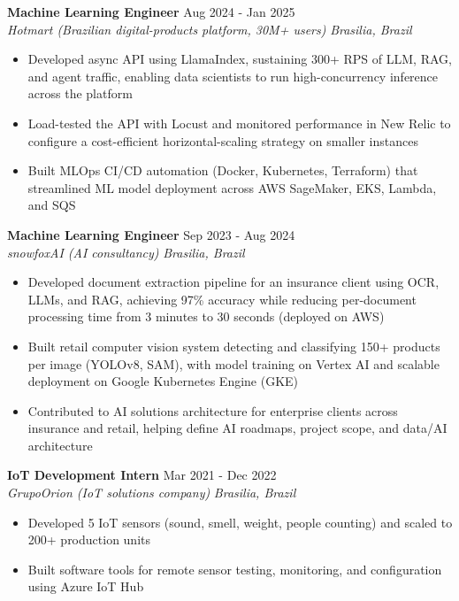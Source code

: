\documentclass[a4paper,10pt]{article}
\newcommand{\entry}[4]{
    \noindent \textbf{#1} \hfill #2 \\
    \textit{#3} \hfill \textit{#4}
}
\begin{document}
\entry{Machine Learning Engineer}{Aug 2024 - Jan 2025}
{Hotmart (Brazilian digital-products platform, 30M+ users)}{Brasilia, Brazil}
\begin{itemize}[noitemsep, topsep=0pt, leftmargin=1.5em]
    \item Developed async API using LlamaIndex, sustaining 300+ RPS of LLM, RAG, and agent traffic, enabling data scientists to run high-concurrency inference across the platform
    \item Load-tested the API with Locust and monitored performance in New Relic to configure a cost-efficient horizontal-scaling strategy on smaller instances
    \item Built MLOps CI/CD automation (Docker, Kubernetes, Terraform) that streamlined ML model deployment across AWS SageMaker, EKS, Lambda, and SQS
\end{itemize}

\vspace{0.15cm}

\entry{Machine Learning Engineer}{Sep 2023 - Aug 2024}
{snowfoxAI (AI consultancy)}{Brasilia, Brazil}
\begin{itemize}[noitemsep, topsep=0pt, leftmargin=1.5em]
    \item Developed document extraction pipeline for an insurance client using OCR, LLMs, and RAG, achieving 97\% accuracy while reducing per-document processing time from 3 minutes to 30 seconds (deployed on AWS)
    \item Built retail computer vision system detecting and classifying 150+ products per image (YOLOv8, SAM), with model training on Vertex AI and scalable deployment on Google Kubernetes Engine (GKE)
    \item Contributed to AI solutions architecture for enterprise clients across insurance and retail, helping define AI roadmaps, project scope, and data/AI architecture
\end{itemize}

\vspace{0.15cm}

\entry{IoT Development Intern}{Mar 2021 - Dec 2022}
{GrupoOrion (IoT solutions company)}{Brasilia, Brazil}
\begin{itemize}[noitemsep, topsep=0pt, leftmargin=1.5em]
    \item Developed 5 IoT sensors (sound, smell, weight, people counting) and scaled to 200+ production units
    \item Built software tools for remote sensor testing, monitoring, and configuration using Azure IoT Hub
\end{itemize}
\end{document}
